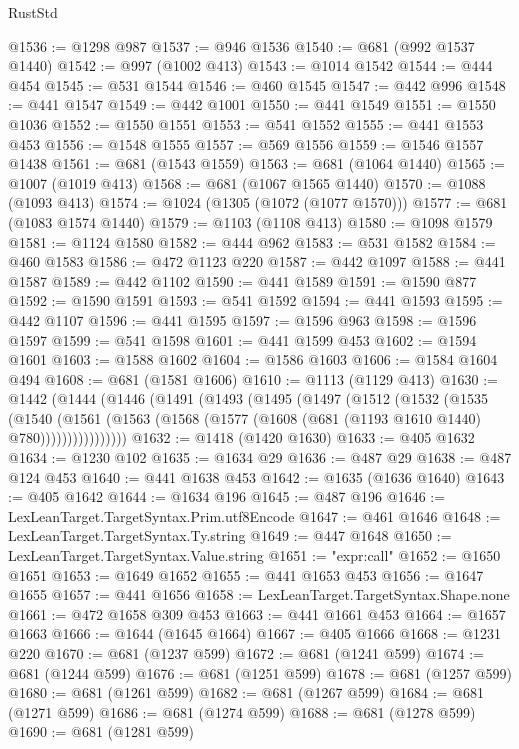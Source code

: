\begin{lexlean}{RustStd}
\begin{coremodule}
@1536 := @1298 @987
@1537 := @946 @1536
@1540 := @681 (@992 @1537 @1440)
@1542 := @997 (@1002 @413)
@1543 := @1014 @1542
@1544 := @444 @454
@1545 := @531 @1544
@1546 := @460 @1545
@1547 := @442 @996
@1548 := @441 @1547
@1549 := @442 @1001
@1550 := @441 @1549
@1551 := @1550 @1036
@1552 := @1550 @1551
@1553 := @541 @1552
@1555 := @441 @1553 @453
@1556 := @1548 @1555
@1557 := @569 @1556
@1559 := @1546 @1557 @1438
@1561 := @681 (@1543 @1559)
@1563 := @681 (@1064 @1440)
@1565 := @1007 (@1019 @413)
@1568 := @681 (@1067 @1565 @1440)
@1570 := @1088 (@1093 @413)
@1574 := @1024 (@1305 (@1072 (@1077 @1570)))
@1577 := @681 (@1083 @1574 @1440)
@1579 := @1103 (@1108 @413)
@1580 := @1098 @1579
@1581 := @1124 @1580
@1582 := @444 @962
@1583 := @531 @1582
@1584 := @460 @1583
@1586 := @472 @1123 @220
@1587 := @442 @1097
@1588 := @441 @1587
@1589 := @442 @1102
@1590 := @441 @1589
@1591 := @1590 @877
@1592 := @1590 @1591
@1593 := @541 @1592
@1594 := @441 @1593
@1595 := @442 @1107
@1596 := @441 @1595
@1597 := @1596 @963
@1598 := @1596 @1597
@1599 := @541 @1598
@1601 := @441 @1599 @453
@1602 := @1594 @1601
@1603 := @1588 @1602
@1604 := @1586 @1603
@1606 := @1584 @1604 @494
@1608 := @681 (@1581 @1606)
@1610 := @1113 (@1129 @413)
@1630 := @1442
    (@1444
      (@1446
        (@1491
          (@1493
            (@1495
              (@1497
                (@1512
                  (@1532
                    (@1535
                      (@1540
                        (@1561
                          (@1563 (@1568 (@1577 (@1608 (@681 (@1193 @1610 @1440) @780))))))))))))))))
@1632 := @1418 (@1420 @1630)
@1633 := @405 @1632
@1634 := @1230 @102
@1635 := @1634 @29
@1636 := @487 @29
@1638 := @487 @124 @453
@1640 := @441 @1638 @453
@1642 := @1635 (@1636 @1640)
@1643 := @405 @1642
@1644 := @1634 @196
@1645 := @487 @196
@1646 := LexLeanTarget.TargetSyntax.Prim.utf8Encode
@1647 := @461 @1646
@1648 := LexLeanTarget.TargetSyntax.Ty.string
@1649 := @447 @1648
@1650 := LexLeanTarget.TargetSyntax.Value.string
@1651 := "expr:call"
@1652 := @1650 @1651
@1653 := @1649 @1652
@1655 := @441 @1653 @453
@1656 := @1647 @1655
@1657 := @441 @1656
@1658 := LexLeanTarget.TargetSyntax.Shape.none
@1661 := @472 @1658 @309 @453
@1663 := @441 @1661 @453
@1664 := @1657 @1663
@1666 := @1644 (@1645 @1664)
@1667 := @405 @1666
@1668 := @1231 @220
@1670 := @681 (@1237 @599)
@1672 := @681 (@1241 @599)
@1674 := @681 (@1244 @599)
@1676 := @681 (@1251 @599)
@1678 := @681 (@1257 @599)
@1680 := @681 (@1261 @599)
@1682 := @681 (@1267 @599)
@1684 := @681 (@1271 @599)
@1686 := @681 (@1274 @599)
@1688 := @681 (@1278 @599)
@1690 := @681 (@1281 @599)

\end{coremodule}
\end{lexlean}
